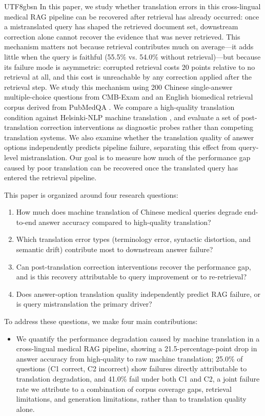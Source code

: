 \documentclass[11pt]{article}
\begin{document}
\begin{CJK}{UTF8}{gbsn}
In this paper, we study whether translation errors in this cross-lingual medical RAG pipeline can be recovered after retrieval has already occurred: once a mistranslated query has shaped the retrieved document set, downstream correction alone cannot recover the evidence that was never retrieved. This mechanism matters not because retrieval contributes much on average---it adds little when the query is faithful (55.5\% vs. 54.0\% without retrieval)---but because its failure mode is asymmetric: corrupted retrieval costs 20 points relative to no retrieval at all, and this cost is unreachable by any correction applied after the retrieval step. We study this mechanism using 200 Chinese single-answer multiple-choice questions from CMB-Exam \cite{wang-etal-2024-cmb} and an English biomedical retrieval corpus derived from PubMedQA \cite{jin-etal-2019-pubmedqa}. We compare a high-quality translation condition against Helsinki-NLP machine translation \cite{tiedemann-thottingal-2020-opus}, and evaluate a set of post-translation correction interventions as diagnostic probes rather than competing translation systems. We also examine whether the translation quality of answer options independently predicts pipeline failure, separating this effect from query-level mistranslation. Our goal is to measure how much of the performance gap caused by poor translation can be recovered once the translated query has entered the retrieval pipeline.

This paper is organized around four research questions:
\begin{enumerate}
\item[\textbf{RQ1}:] How much does machine translation of Chinese medical queries degrade end-to-end answer accuracy compared to high-quality translation?
\item[\textbf{RQ2}:] Which translation error types (terminology error, syntactic distortion, and semantic drift) contribute most to downstream answer failure? 
\item[\textbf{RQ3}:] Can post-translation correction interventions recover the performance gap, and is this recovery attributable to query improvement or to re-retrieval?
\item[\textbf{RQ4}:] Does answer-option translation quality independently predict RAG failure, or is query mistranslation the primary driver?
\end{enumerate}


To address these questions, we make four main contributions:
\begin{itemize}
\item We quantify the performance degradation caused by machine translation in a cross-lingual medical RAG pipeline, showing a 21.5-percentage-point drop in answer accuracy from high-quality to raw machine translation; 25.0\% of questions (C1 correct, C2 incorrect) show failures directly attributable to translation degradation, and 41.0\% fail under both C1 and C2, a joint failure rate we attribute to a combination of corpus coverage gaps, retrieval limitations, and generation limitations, rather than to translation quality alone.


\end{itemize}
\end{CJK}
\end{document}
